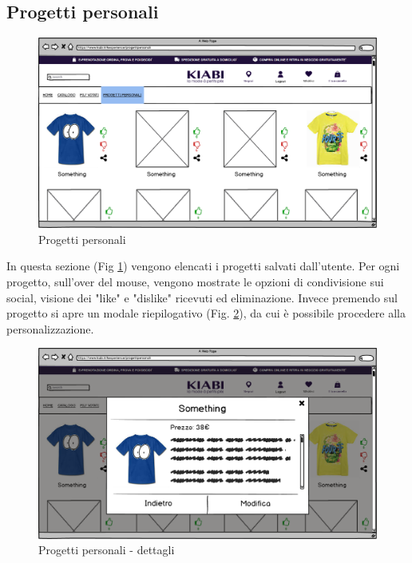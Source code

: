 \documentclass[12pt,italian,]{report}
\begin{document}
\newpage
\hypertarget{progetti-personali}{%
\subsection{Progetti personali}\label{progetti-personali}}

\begin{figure}[h]
\centering
\includegraphics{../balsamiq/balsamiq_finale/ProgettiPersonali.png}
\caption{Progetti personali}
\label{prog-pers}
\end{figure}

In questa sezione (Fig \ref{prog-pers}) vengono elencati i progetti salvati dall'utente. Per ogni progetto, sull'over del mouse, vengono mostrate le opzioni di condivisione sui social, visione dei "like" e "dislike" ricevuti ed eliminazione. Invece premendo sul progetto si apre un modale riepilogativo (Fig. \ref{prog-pers-dett}), da cui è possibile procedere alla personalizzazione.

\begin{figure}[h]
\centering
\includegraphics{../balsamiq/balsamiq_finale/ProgettiPersonalidetails.png}
\caption{Progetti personali - dettagli}
\label{prog-pers-dett}
\end{figure}
\end{document}
